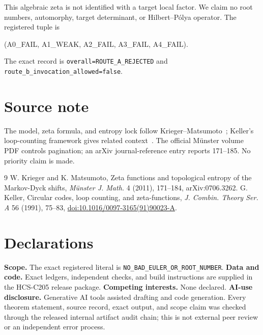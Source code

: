 \documentclass[11pt]{article}
\begin{document}
This algebraic zeta is not identified with a target local factor.  We claim no
root numbers, automorphy, target determinant, or Hilbert--P\'olya operator.  The
registered tuple is
\begin{center}\small\ttfamily
(A0\_FAIL, A1\_WEAK, A2\_FAIL, A3\_FAIL, A4\_FAIL).
\end{center}
The exact record is \texttt{overall=ROUTE\_A\_REJECTED} and
\texttt{route\_b\_invocation\_allowed=false}.
\fi

\section*{Source note}
The model, zeta formula, and entropy lock follow
Krieger--Matsumoto~\cite{km2011}; Keller's loop-counting framework gives
related context~\cite{keller1991}.  The official M\"unster volume PDF controls
pagination; an arXiv journal-reference entry reports 171--185.  No priority
claim is made.
\begin{thebibliography}{9}
 W. Krieger and K. Matsumoto, Zeta functions and topological
entropy of the Markov-Dyck shifts, \emph{M\"unster J. Math.} 4 (2011),
171--184, arXiv:0706.3262.
 G. Keller, Circular codes, loop counting, and
zeta-functions, \emph{J. Combin. Theory Ser. A} 56 (1991), 75--83,
\href{https://doi.org/10.1016/0097-3165(91)90023-A}{doi:10.1016/0097-3165(91)90023-A}.
\end{thebibliography}
\section*{Declarations}
\textbf{Scope.} The exact registered literal is
\texttt{NO\_BAD\_EULER\_OR\_ROOT\_NUMBER}.
\textbf{Data and code.} Exact ledgers, independent checks, and build
instructions are supplied in the HCS-C205 release package.
\textbf{Competing interests.} None declared.
\textbf{AI-use disclosure.} Generative AI tools assisted drafting and code
generation.  Every theorem statement, source record, exact output, and scope
claim was checked through the released internal artifact audit chain; this is
not external peer review or an independent error process.
\end{document}

